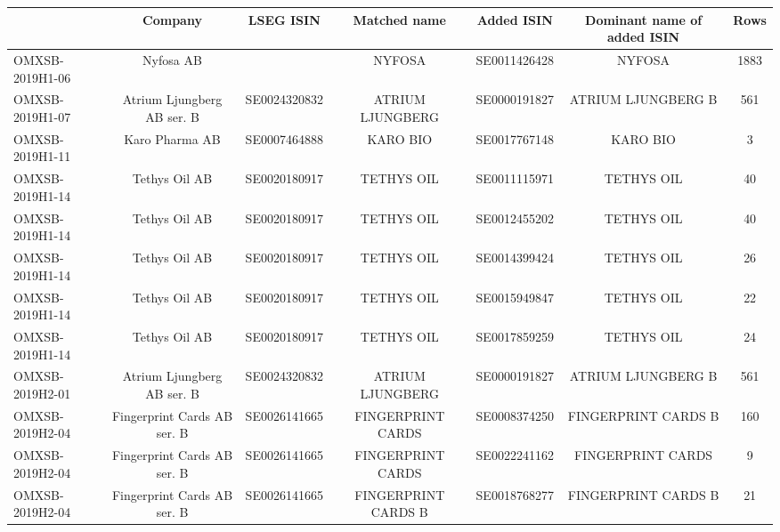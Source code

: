 \begin{threeparttable}
\begingroup
\renewcommand\cellalign{t}
\renewcommand\arraystretch{1}
\setlength{\tabcolsep}{5pt}
\begin{tabular}{@{}lcccccc}
\toprule
 & Company & LSEG ISIN & Matched name & Added ISIN & Dominant name of added ISIN & Rows \\
\midrule
\addlinespace[1ex]
OMXSB-2019H1-06 & Nyfosa AB &  & NYFOSA & SE0011426428 & NYFOSA & 1883 \\
\addlinespace[0.25ex]
\addlinespace[0.25ex]
OMXSB-2019H1-07 & Atrium Ljungberg AB ser. B & SE0024320832 & ATRIUM LJUNGBERG & SE0000191827 & ATRIUM LJUNGBERG B & 561 \\
\addlinespace[0.25ex]
\addlinespace[0.25ex]
OMXSB-2019H1-11 & Karo Pharma AB & SE0007464888 & KARO BIO & SE0017767148 & KARO BIO & 3 \\
\addlinespace[0.25ex]
\addlinespace[0.25ex]
OMXSB-2019H1-14 & Tethys Oil AB & SE0020180917 & TETHYS OIL & SE0011115971 & TETHYS OIL & 40 \\
\addlinespace[0.25ex]
\addlinespace[0.25ex]
OMXSB-2019H1-14 & Tethys Oil AB & SE0020180917 & TETHYS OIL & SE0012455202 & TETHYS OIL & 40 \\
\addlinespace[0.25ex]
\addlinespace[0.25ex]
OMXSB-2019H1-14 & Tethys Oil AB & SE0020180917 & TETHYS OIL & SE0014399424 & TETHYS OIL & 26 \\
\addlinespace[0.25ex]
\addlinespace[0.25ex]
OMXSB-2019H1-14 & Tethys Oil AB & SE0020180917 & TETHYS OIL & SE0015949847 & TETHYS OIL & 22 \\
\addlinespace[0.25ex]
\addlinespace[0.25ex]
OMXSB-2019H1-14 & Tethys Oil AB & SE0020180917 & TETHYS OIL & SE0017859259 & TETHYS OIL & 24 \\
\addlinespace[0.25ex]
\addlinespace[0.25ex]
OMXSB-2019H2-01 & Atrium Ljungberg AB ser. B & SE0024320832 & ATRIUM LJUNGBERG & SE0000191827 & ATRIUM LJUNGBERG B & 561 \\
\addlinespace[0.25ex]
\addlinespace[0.25ex]
OMXSB-2019H2-04 & Fingerprint Cards AB ser. B & SE0026141665 & FINGERPRINT CARDS & SE0008374250 & FINGERPRINT CARDS B & 160 \\
\addlinespace[0.25ex]
\addlinespace[0.25ex]
OMXSB-2019H2-04 & Fingerprint Cards AB ser. B & SE0026141665 & FINGERPRINT CARDS & SE0022241162 & FINGERPRINT CARDS & 9 \\
\addlinespace[0.25ex]
\addlinespace[0.25ex]
OMXSB-2019H2-04 & Fingerprint Cards AB ser. B & SE0026141665 & FINGERPRINT CARDS B & SE0018768277 & FINGERPRINT CARDS B & 21 \\

\end{tabular}
\end{threeparttable}
